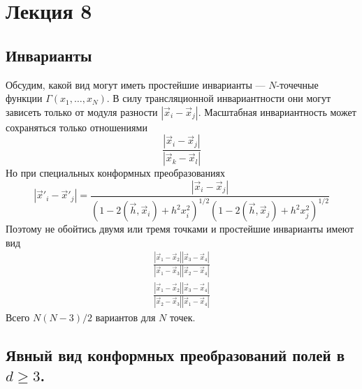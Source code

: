 \documentclass[a4paper,12pt]{article}
\theoremstyle{definition}
\theoremstyle{definition}
\theoremstyle{definition}
\begin{document}
\section{Лекция 8}
\label{sec:lecture-8}

\subsection{Инварианты}
\label{sec:invariants}

Обсудим, какой вид могут иметь простейшие инварианты --- $N$-точечные функции $\Gamma(x_1,\dots,x_N)$. В силу трансляционной инвариантности они могут зависеть только от модуля разности $|\vec x_i-\vec x_j|$.  Масштабная инвариантность может сохраняться только отношениями
\begin{equation}
  \label{eq:173}
  \frac{|\vec x_i-\vec x_j|}{|\vec x_k -\vec x_l|}
\end{equation}
Но при специальных конформных преобразованиях
\begin{equation}
  \label{eq:174}
  |\vec x'_i-\vec x'_j|=\frac{|\vec x_i-\vec x_j|}{(1-2(\vec h,\vec x_i)+h^2x_i^2)^{1/2} (1-2(\vec h,\vec x_j)+h^2 x_j^2)^{1/2}}
\end{equation}
Поэтому не обойтись двумя или тремя точками и простейшие инварианты имеют вид
\begin{eqnarray}
  \label{eq:175}
  \frac{|\vec x_1-\vec x_2||\vec x_3-\vec x_4|}{|\vec x_1-\vec x_3||\vec x_{2}-\vec x_{4}|}\\
  \frac{|\vec x_1-\vec x_2||\vec x_3-\vec x_4|}{|\vec x_2-\vec x_3||\vec x_{1}-\vec x_{4}|}
\end{eqnarray}
Всего $N(N-3)/2$ вариантов для $N$ точек.

\subsection{Явный вид конформных преобразований полей в $d\geq 3$.}
\label{sec:conformal-transforms-explicit}
\end{document}
